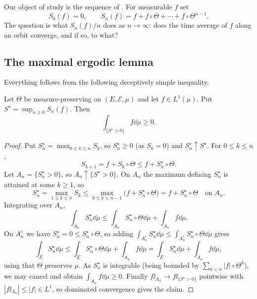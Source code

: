 \documentclass[a4paper]{scrartcl}
\newcommand{\cE}{\mathcal{E}}
\newcommand{\ind}{\ii}
\begin{document}
\begin{center}
\end{center}

Our object of study is the sequence of . For measurable $f$ set
$$
S_0(f)=0, \qquad S_n(f) = f + f\circ\Theta + \cdots+f\circ\Theta^{n-1}.
$$
The question is what $S_n(f)/n$ does as $n \to \infty$: does the time average of $f$ along an orbit converge, and if so, to what?

\subsection{The maximal ergodic lemma}

Everything follows from the following deceptively simple inequality.

\begin{lemma}\label{lem:maximal}
	Let $\Theta$ be measure-preserving on $(E,\cE,\mu)$ and let $f \in L^1(\mu)$. Put $S^\star = \sup_{n\geq0}S_n(f)$. Then
	$$
	\int_{\{S^\star>0\}} f \dd\mu \geq 0.
	$$
\end{lemma}
\begin{proof}
	Put $S_n^\star = \max_{0\leq k\leq n}S_k$, so $S_n^\star \geq 0$ (as $S_0 = 0$) and $S_n^\star \uparrow S^\star$. For $0 \leq k \leq n$,
	$$
	S_{k+1} = f + S_k \circ\Theta \leq f + S_n^\star\circ\Theta.
	$$
	Let $A_n = \{S_n^\star>0\}$, so $A_n \uparrow \{S^\star>0\}$. On $A_n$ the maximum defining $S_n^\star$ is attained at some $k \geq 1$, so
	$$
	S_n^\star = \max_{1\leq k \leq n}S_k \leq \max_{0\leq k\leq n-1}\big(f + S_n^\star\circ\Theta\big) = f + S_n^\star\circ\Theta \quad \text{on } A_n.
	$$
	Integrating over $A_n$,
	$$
	\int_{A_n}S_n^\star\dd\mu \leq \int_{A_n}S_n^\star\circ\Theta\dd\mu + \int_{A_n}f\dd\mu.
	$$
	On $A_n^c$ we have $S_n^\star=0\leq S_n^\star\circ\Theta$, so adding $\int_{A_n^c}S_n^\star\dd\mu \leq \int_{A_n^c}S_n^\star\circ\Theta\dd\mu$ gives
	$$
	\int_E S_n^\star\dd\mu \leq \int_E S_n^\star\circ\Theta\dd\mu+\int_{A_n}f\dd\mu = \int_E S_n^\star\dd\mu + \int_{A_n}f\dd\mu,
	$$
	using that $\Theta$ preserves $\mu$. As $S_n^\star$ is integrable (being bounded by $\sum_{k<n}|f|\circ\Theta^k$), we may cancel and obtain $\int_{A_n}f\dd\mu \geq 0$. Finally $f\ind_{A_n}\to f\ind_{\{S^\star>0\}}$ pointwise with $|f\ind_{A_n}|\leq|f| \in L^1$, so dominated convergence gives the claim.
\end{proof}
\end{document}
